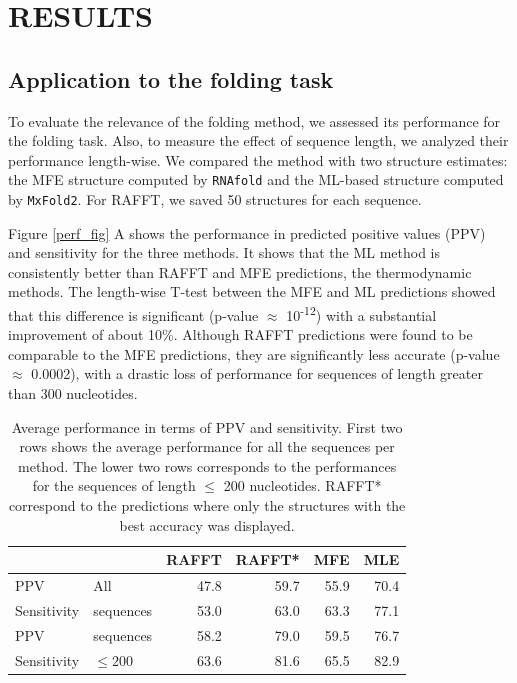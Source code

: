 \documentclass[a4paper,12pt]{article}
\begin{document}
\section*{RESULTS}
\label{sec:org3ab19b4}
\subsection*{Application to the folding task}
\label{sec:org72156fe}
To evaluate the relevance of the folding method, we assessed its performance for
the folding task. Also, to measure the effect of sequence length, we analyzed
their performance length-wise. We compared the method with two structure
estimates: the MFE structure computed by \texttt{RNAfold} and the ML-based structure
computed by \texttt{MxFold2}. For RAFFT, we saved 50 structures for each sequence.

Figure \ref{perf_fig} A shows the performance in predicted positive values (PPV)
and sensitivity for the three methods. It shows that the ML method is
consistently better than RAFFT and MFE predictions, the thermodynamic methods.
The length-wise T-test between the MFE and ML predictions showed that this
difference is significant (p-value \(\approx\) 10\textsuperscript{-12}) with a substantial
improvement of about 10\%. Although RAFFT predictions were found to be comparable
to the MFE predictions, they are significantly less accurate (p-value \(\approx\)
0.0002), with a drastic loss of performance for sequences of length greater than
300 nucleotides.


\begin{table}[htbp]
\caption{\label{average_perf}Average performance in terms of PPV and sensitivity. First two rows shows the average performance for all the sequences per method. The lower two rows corresponds to the performances for the sequences of length \(\leq\) 200 nucleotides. RAFFT* correspond to the predictions where only the structures with the best accuracy was displayed.}
\centering
\begin{tabular}{llrrrr}
\hline
            &              & RAFFT & RAFFT* & MFE  & MLE\\
\hline
PPV         & All          & 47.8  & 59.7   & 55.9 & 70.4\\
Sensitivity & sequences    & 53.0  & 63.0   & 63.3 & 77.1\\
\hline
PPV         & sequences    & 58.2  & 79.0   & 59.5 & 76.7\\
Sensitivity & \(\leq 200\) & 63.6  & 81.6   & 65.5 & 82.9\\
\hline
\end{tabular}
\end{table}
\end{document}
